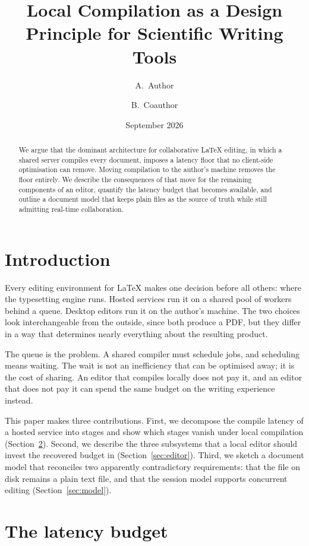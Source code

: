 \documentclass[11pt,a4paper]{article}
\title{Local Compilation as a Design Principle for Scientific Writing Tools}
\author{A.~Author \and B.~Coauthor}
\date{September 2026}
\theoremstyle{definition}
\begin{document}
\maketitle

\begin{abstract}
We argue that the dominant architecture for collaborative \LaTeX{} editing, in which a shared
server compiles every document, imposes a latency floor that no client-side optimisation can
remove. Moving compilation to the author's machine removes the floor entirely. We describe the
consequences of that move for the remaining components of an editor, quantify the latency budget
that becomes available, and outline a document model that keeps plain files as the source of
truth while still admitting real-time collaboration.
\end{abstract}

\section{Introduction}

Every editing environment for \LaTeX{} makes one decision before all others: where the
typesetting engine runs. Hosted services run it on a shared pool of workers behind a queue.
Desktop editors run it on the author's machine. The two choices look interchangeable from the
outside, since both produce a PDF, but they differ in a way that determines nearly everything
about the resulting product.

The queue is the problem. A shared compiler must schedule jobs, and scheduling means waiting.
The wait is not an inefficiency that can be optimised away; it is the cost of sharing. An editor
that compiles locally does not pay it, and an editor that does not pay it can spend the same
budget on the writing experience instead.

This paper makes three contributions. First, we decompose the compile latency of a hosted
service into stages and show which stages vanish under local compilation
(Section~\ref{sec:latency}). Second, we describe the three subsystems that a local editor
should invest the recovered budget in (Section~\ref{sec:editor}). Third, we sketch a document
model that reconciles two apparently contradictory requirements: that the file on disk remains a
plain text file, and that the session model supports concurrent editing
(Section~\ref{sec:model}).

\section{The latency budget}
\label{sec:latency}
\end{document}
